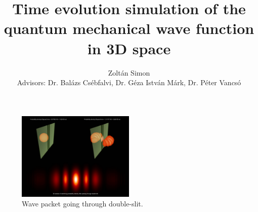 \documentclass[11pt]{article}
\title{Time evolution simulation of the quantum mechanical wave function in 3D space}
\author{Zoltán Simon\\[1cm]{\small Advisors: Dr. Balázs Csébfalvi, Dr. Géza István Márk, Dr. Péter Vancsó}}
\begin{document}
	
	\maketitle
	
	\begin{figure}[H]
		\centering
		\includegraphics[width=0.5\textwidth]{"figures/preview_image.jpeg"}
		\caption{Wave packet going through double-slit.}
		\label{fig:penetrating_potential}
	\end{figure}
	\thispagestyle{empty}
	\pagebreak
	
	\tableofcontents
	
	\pagebreak

	

	\pagebreak
	
	
	
	

	

	

		

		

	
	
\end{document}
